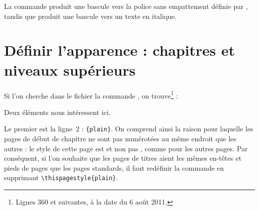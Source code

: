 \begin{latexcode}
\makeatletter
\renewcommand\section{\@startsection {section}{1}{\z@}%
                             {-3.5ex \@plus -1ex \@minus -.2ex}%
                             {2.3ex \@plus.2ex}%
                             {\sffamily\Large\itshape}}
\makeatother
\end{latexcode}

La commande  produit une bascule vers la police sans empattement définie par , tandis que  produit une bascule vers un texte en italique.

\section{Définir l'apparence : chapitres et niveaux supérieurs}

Si l'on cherche dans le fichier  la commande , on trouve\footnote{Lignes 360 et suivantes, à la date du 6 août 2011.} :

\begin{latexcode}
\newcommand\chapter{\if@openright\cleardoublepage\else\clearpage\fi
                    \thispagestyle{plain}%
                    \global\@topnum\z@
                    \@afterindentfalse
                    \secdef\@chapter\@schapter}
\end{latexcode}

Deux éléments nous intéressent ici.

Le premier est la ligne~2 : \verb|{plain}|. On comprend ainsi la raison pour laquelle les  pages de début de chapitre ne sont pas numérotées au même endroit que les autres : le style de cette page est  et non pas , comme pour les autres pages. Par conséquent, si l'on souhaite que les pages de titres aient les mêmes en-têtes et pieds de pages que les pages standards, il faut redéfinir la commande  en supprimant \verb|\thispagestyle{plain}|.\label{entetechapter}\label{chapitrepagestyle}

\begin{latexcode}
\makeatletter
\renewcommand\chapter{\if@openright\cleardoublepage %
                    \else\clearpage\fi
                    \global\@topnum\z@
                    \@afterindentfalse
                    \secdef\@chapter\@schapter}
\makeatother
\end{latexcode}

